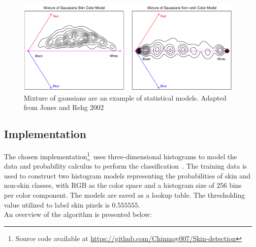 \begin{figure}[h]
    \centering
    \includegraphics[width=0.9\linewidth]{images/approaches/statistical/statistical_model.png}
    \caption{Mixture of gaussians are an example of statistical models.
    Adapted from Jones and Rehg 2002~\cite{jones2002statistical}}
    \label{fig:statistical-model-example}
\end{figure}


\FloatBarrier
\subsection{Implementation}\label{sec:impl-bayes}

The chosen implementation\footnote{Source code available at \url{https://github.com/Chinmoy007/Skin-detection}}\ uses three-dimensional histograms to model the data and probability calculus to perform the classification~\cite{acharjee2018skin}.
The training data is used to construct two histogram models representing the probabilities of skin and non-skin classes, with RGB as the color space and a histogram size of $256$ bins per color component.
The models are saved as a lookup table.
The thresholding value utilized to label skin pixels is $0.555555$.\\
An overview of the algorithm is presented below:
\vspace{5mm}

